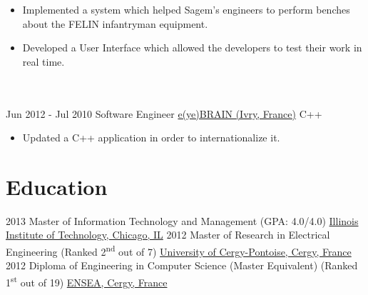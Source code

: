 \documentclass[letterpaper]{template} %
\begin{document}
\begin{twenty}
        {\begin{itemize}
            \item Implemented a system which helped Sagem’s engineers to perform benches about the FELIN infantryman equipment.
            \item Developed a User Interface which allowed the developers to test their work in real time.
        \end{itemize}}
    \\\divider\\
     \twentyitem
   		{Jun 2012 - Jul 2010}
		{}
        {Software Engineer}
        {\href{http://www.eyebrain.fr/}{e(ye)BRAIN (Ivry, France)}}
        {C++}
        {\begin{itemize}
            \item Updated a C++ application in order to internationalize it.
        \end{itemize}}
        
\end{twenty}

\section{Education}

\begin{twenty} %
	\twentyitem
    	{2013}
        {}
        {Master of Information Technology and Management \textnormal{(GPA: 4.0/4.0)}}
        {}
        {\href{https://web.iit.edu/}{Illinois Institute of Technology, Chicago, IL}}
        {}
	\twentyitem
    	{2012}
		{}
        {Master of Research in Electrical Engineering \textnormal{(Ranked 2\textsuperscript{nd} out of 7)}}
        {}
        {\href{https://www.u-cergy.fr/en/index.html}{University of Cergy-Pontoise, Cergy, France}}
        {}
    \twentyitem
    	{2012}
		{}
        {Diploma of Engineering in Computer Science (Master Equivalent) \textnormal{(Ranked 1\textsuperscript{st} out of 19)}}
        {}
        {\href{https://www.ensea.fr/en}{ENSEA, Cergy, France}}
        {}
\end{twenty}
\end{document}
